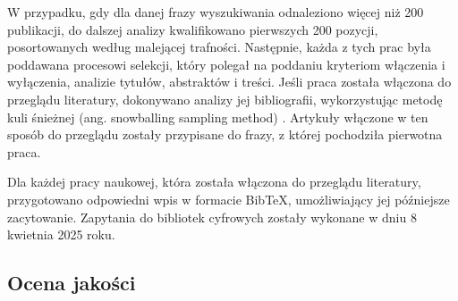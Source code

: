 W przypadku, gdy dla danej frazy wyszukiwania odnaleziono więcej niż 200 publikacji, do dalszej analizy kwalifikowano pierwszych 200 pozycji, posortowanych według malejącej trafności.
Następnie, każda z tych prac była poddawana procesowi selekcji, który polegał na poddaniu kryteriom włączenia i wyłączenia, analizie tytułów, abstraktów i treści.
Jeśli praca została włączona do przeglądu literatury, dokonywano analizy jej bibliografii, wykorzystując metodę kuli śnieżnej (ang. snowballing sampling method) \cite{10.1214/aoms/1177705148}.
Artykuły włączone w ten sposób do przeglądu zostały przypisane do frazy, z której pochodziła pierwotna praca.

Dla każdej pracy naukowej, która została włączona do przeglądu literatury, przygotowano odpowiedni wpis w formacie BibTeX, umożliwiający jej późniejsze zacytowanie. 
Zapytania do bibliotek cyfrowych zostały wykonane w dniu 8 kwietnia 2025 roku. 

\subsection{Ocena jakości}\label{chapter:ocena_jakosci}
